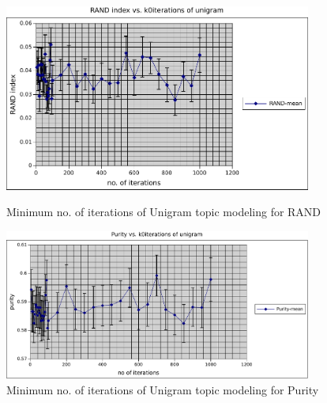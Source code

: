 \begin{figure}
    \centering
    \begin{minipage}{0.45\textwidth}
        \centering
        \includegraphics[width=0.9\textwidth]{rand_k0iter_umm.pdf}
        \caption{Minimum no. of iterations of Unigram topic modeling for RAND}
    \end{minipage}\hfill
    \begin{minipage}{0.45\textwidth}
        \centering
        \includegraphics[width=0.9\textwidth]{purity_k0iter_umm.pdf}
        \caption{Minimum no. of iterations of Unigram topic modeling for Purity}
    \end{minipage}
\end{figure}
